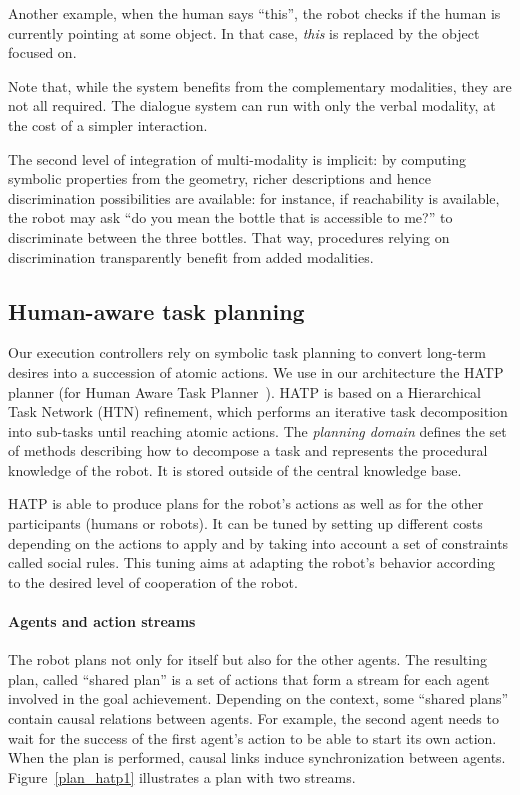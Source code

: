 \documentclass[preprint,5p]{elsarticle}
\begin{document}
Another example, when the human says ``this'', the robot checks if the human is
currently pointing at some object. In that case, \emph{this} is replaced by the
object focused on.

Note that, while the system benefits from the complementary modalities, they
are not all required. The dialogue system can run with only the verbal
modality, at the cost of a simpler interaction.

The second level of integration of multi-modality is implicit: by computing
symbolic properties from the geometry, richer descriptions and hence
discrimination possibilities are available: for instance, if reachability is
available, the robot may ask ``do you mean the bottle that is accessible to
me?'' to discriminate between the three bottles. That way, procedures relying
on discrimination transparently benefit from added modalities.


\subsection{Human-aware task planning}

Our execution controllers rely on symbolic task planning to convert long-term
desires into a succession of atomic actions. We use in our architecture the
HATP planner (for Human Aware Task Planner~\cite{Alili2008, Alili2009}).  HATP
is based on a Hierarchical Task Network (HTN) refinement, which performs an
iterative task decomposition into sub-tasks until reaching atomic
actions. The \emph{planning domain} defines the set of methods describing how
to decompose a task and represents the procedural knowledge of the robot. It is
stored outside of the central knowledge base.

HATP is able to produce plans for the robot's actions as well as for the other
participants (humans or robots). It can be tuned by setting up different costs
depending on the actions to apply and by taking into account a set of
constraints called social rules. This tuning aims at adapting the robot's
behavior according to the desired level of cooperation of the robot.

\paragraph{Agents and action streams}
The robot plans not only for itself but also for the other agents. The
resulting plan, called ``shared plan'' is a set of actions that form
a stream for each agent involved in the goal achievement. Depending on
the context, some ``shared plans'' contain causal relations between
agents. For example, the second agent needs to wait for the success of
the first agent's action to be able to start its own action. When the
plan is performed, causal links induce synchronization between
agents. Figure~\ref{plan_hatp1} illustrates a plan with two streams.
\end{document}
